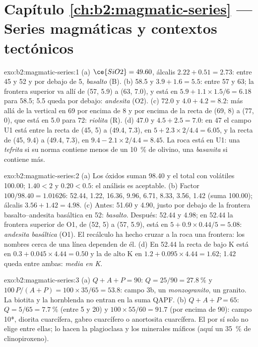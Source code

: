 \section*{Capítulo \ref{ch:b2:magmatic-series} --- Series magmáticas y contextos tectónicos}

\begin{solution}{exo:b2:magmatic-series:1}
(a) $\ce{SiO2} = 49.60$, álcalis $2.22 + 0.51 = 2.73$: entre 45 y 52 y por debajo de 5,
\emph{basalto} (B). (b) 58.5 y $3.9 + 1.6 = 5.5$: entre 57 y 63; la frontera
superior va allí de (57, 5.9) a (63, 7.0), y está en $5.9 + 1.1\times1.5/6 = 6.18$
para 58.5; 5.5 queda por debajo: \emph{andesita} (O2). (c) 72.0 y $4.0 + 4.2 = 8.2$:
más allá de la vertical en 69 por encima de 8 y por encima de la recta de (69, 8) a (77, 0), que
está en 5.0 para 72: \emph{riolita} (R). (d) 47.0 y $4.5 + 2.5 = 7.0$: en 47 el campo U1
está entre la recta de (45, 5) a (49.4, 7.3), en $5 + 2.3\times2/4.4 = 6.05$, y
la recta de (45, 9.4) a (49.4, 7.3), en $9.4 - 2.1\times2/4.4 = 8.45$. La roca está
en U1: una \emph{tefrita} si su norma contiene menos de un \qty{10}{\percent} de olivino, una
\emph{basanita} si contiene más.
\end{solution}

\begin{solution}{exo:b2:magmatic-series:2}
(a) Los óxidos suman 98.40 y el total con volátiles 100.00;
 $1.40 < 2$ y  $0.20 < 0.5$: el análisis es aceptable. (b) Factor
$100/98.40 = 1.01626$:  52.44,  1.22,  16.36,
 9.96,  6.71,  8.33,  3.56,  1.42
(suma 100.00); álcalis $3.56 + 1.42 = 4.98$. (c) Antes: 51.60 y 4.90, justo por debajo de la
frontera basalto--andesita basáltica en 52: \emph{basalto}. Después: 52.44 y 4.98; en
52.44 la frontera superior de O1, de (52, 5) a (57, 5.9), está en $5 + 0.9\times0.44/5
= 5.08$: \emph{andesita basáltica} (O1). El recálculo ha hecho cruzar a la roca una
frontera: los nombres cerca de una línea dependen de él. (d) En 52.44 la recta de bajo K está en $0.3 +
0.045\times4.44 = 0.50$ y la de alto K en $1.2 + 0.095\times4.44 = 1.62$; 1.42
queda entre ambas: \emph{media en K}.
\end{solution}

\begin{solution}{exo:b2:magmatic-series:3}
(a) $Q + A + P = 90$: $Q = 25/90 = \qty{27.8}{\percent}$ y $100\,P/(A + P) =
100\times35/65 = 53.8$: campo 3b, un \emph{monzogranito}, un granito. La biotita y la
hornblenda no entran en la suma QAPF. (b) $Q + A + P = 65$: $Q = 5/65 =
\qty{7.7}{\percent}$ (entre 5 y 20) y $100\times55/60 = 91.7$ (por encima de 90): campo
10*, diorita cuarcífera, gabro cuarcífero o anortosita cuarcífera. El  por sí solo no
elige entre ellas; lo hacen la plagioclasa y los minerales máficos (aquí un
\qty{35}{\percent} de clinopiroxeno).
\end{solution}

